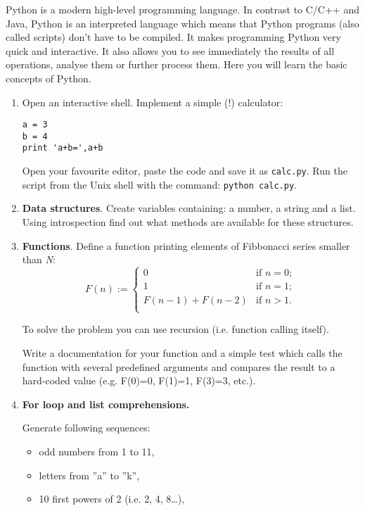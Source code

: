 \documentclass[12pt]{article}
\begin{document}
\medskip
Python is a modern high-level programming language. In contrast to C/C++ and Java, Python is an interpreted language which means that Python programs (also called scripts) don't have to be compiled. It makes programming Python very quick and interactive. It also allows you to see immediately the results of all operations, analyse them or further process them. Here you will learn the basic concepts of Python.\\
\begin{enumerate}
\item  Open an interactive shell. Implement  a simple (!) calculator:
\begin{verbatim}
a = 3
b = 4
print 'a+b=',a+b
\end{verbatim}
Open your favourite editor, paste the code and save it as \texttt{calc.py}. Run the script from the Unix shell with the command: \texttt{python calc.py}.\\ 
\item \textbf{Data structures}. Create variables containing: 
a number, a string and a list. Using introspection find out what methods are available for these structures.\\
\item \textbf{Functions}. Define a function printing elements of Fibbonacci series smaller than \textit{N}:
$$F(n):=  
  \begin{cases}
    0             & \mbox{if } n = 0; \\
    1             & \mbox{if } n = 1; \\
    F(n-1)+F(n-2) & \mbox{if } n > 1. \\
   \end{cases}$$

To solve the problem you can use recursion (i.e. function calling
itself). 

Write a documentation for your function and  a simple test which calls
the function with several predefined arguments and compares the result to
a hard-coded value (e.g. F(0)=0, F(1)=1, F(3)=3, etc.).
\item \textbf{For loop and list comprehensions.} 

        Generate following sequences:

        \begin{itemize}
            \item odd numbers from 1 to 11,
            \item letters from ''a'' to ''k'',
            \item 10 first powers of 2 (i.e. 2, 4,
                8\dots),
        \end{itemize}


\end{enumerate}
\end{document}
